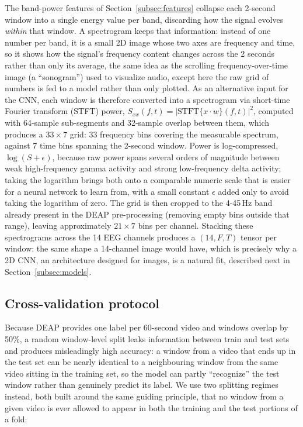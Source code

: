 \documentclass[conference]{IEEEtran}
\begin{document}
The band-power features of Section~\ref{subsec:features} collapse each
2-second window into a single energy value per band, discarding how the
signal evolves \emph{within} that window. A spectrogram keeps that
information: instead of one number per band, it is a small 2D image whose
two axes are frequency and time, so it shows how the signal's frequency
content changes across the 2 seconds rather than only its average, the
same idea as the scrolling frequency-over-time image (a ``sonogram'')
used to visualize audio, except here the raw grid of numbers is fed to a
model rather than only plotted. As an
alternative input for the CNN, each window is therefore converted into a
spectrogram via short-time Fourier transform (STFT) power,
$S_{xx}(f,t) = |\text{STFT}\{x \cdot w\}(f,t)|^2$, computed with
64-sample sub-segments and 32-sample overlap between them, which produces
a $33 \times 7$ grid: 33 frequency bins covering the measurable spectrum,
against 7 time bins spanning the 2-second window. Power is log-compressed,
$\log(S + \epsilon)$, because raw power spans several orders of magnitude
between weak high-frequency gamma activity and strong low-frequency delta
activity; taking the logarithm brings both onto a comparable numeric
scale that is easier for a neural network to learn from, with a small
constant $\epsilon$ added only to avoid taking the logarithm of zero. The
grid is then cropped to the 4-45\,Hz band already present in the DEAP
pre-processing (removing empty bins outside that range), leaving
approximately $21 \times 7$ bins per channel. Stacking these
spectrograms across the 14 EEG channels produces a $(14, F, T)$ tensor per
window: the same shape a 14-channel image would have, which is precisely
why a 2D CNN, an architecture designed for images, is a natural fit,
described next in Section~\ref{subsec:models}.

\subsection{Cross-validation protocol}
\label{subsec:splits}

Because DEAP provides one label per 60-second video and windows overlap by
50\%, a random window-level split leaks information between train and
test sets and produces misleadingly high accuracy: a window from a video
that ends up in the test set can be nearly identical to a neighbouring
window from the same video sitting in the training set, so the model can
partly ``recognize'' the test window rather than genuinely predict its
label. We use two splitting regimes instead, both built around the same
guiding principle, that no window from a given video is ever allowed to
appear in both the training and the test portions of a fold:
\end{document}
